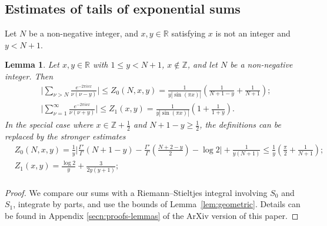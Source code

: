 \documentclass[11pt,letterpaper,oneside,reqno]{amsart}
\renewcommand{\^}[1]{\widehat{#1}}
\newcommand{\R}{{\mathbb{R}}}
\newcommand{\Z}{{\mathbb{Z}}}
\numberwithin{equation}{section}
\newtheorem{lemma}[theorem]{Lemma}
\theoremstyle{remark}
\begin{document}
\subsection{Estimates of tails of exponential sums}
Let $N$ be a non-negative integer, and $x,y\in\R$ satisfying $x$ is not an integer and $y< N+1$.
%
\begin{lemma} \label{lemma_bnd_S_plus_minus}
Let $x,y\in\R$ with $1\leq y< N+1$, $x\notin\Z$,  and let $N$ be a non-negative integer. Then
    \begin{align}
    & \label{bnd-Sminus}
    \bigg|  \sum_{ \nu > N} \frac{e^{-2\pi i \nu x}}{\nu(\nu-y) }\bigg|  \leq Z_0(N,x,y) =  
   \frac{1}{y|\sin(\pi x)|} \left( \frac{1}{N+1-y} + \frac{1}{N+1} \right)
        ;\\
     & \label{bnd-Splus}
     \bigg| \sum_{ \nu=1}^{\infty} \frac{e^{-2\pi i \nu x}}{\nu(\nu+y) }\bigg|  \leq Z_1(x,y) =     
     \frac{1}{y|\sin(\pi x)|} \left( 1+\frac{1}{1+y} \right).
    \end{align}
    In the special case where $x\in\Z+\frac{1}{2}$ and $N+1-y \geq \frac{1}{2}$, the definitions can be replaced by the stronger estimates
    \begin{equation}
        \begin{split}
            &Z_0(N,x,y) =  \frac{1}{y}  \bigg| \frac{\Gamma'}{\Gamma}(N+1-y) - \frac{\Gamma'}{\Gamma}\left(\frac{N+2-y}{2}\right) - \log 2  \bigg|   +\frac{1}{y(N+1)} \leq \frac{1}{y}\left(\frac{\pi}{2} + \frac{1}{N+1} \right); 
\\
        &Z_1(x,y) =     
        \frac{\log 2}{y} + \frac{3}{2y(y+1)};\label{def:z01-halfInteger}
    \\%
        \end{split}
    \end{equation}
\end{lemma}
%
\begin{proof}
We compare our sums with a Riemann--Stieltjes integral involving $S_0$ and
$S_1$, integrate by parts, and use the bounds of Lemma~\ref{lem:geometric}. Details can be found in Appendix \ref{secn:proofs-lemmas} of the ArXiv version of this paper. %
\end{proof}
%
\end{document}
